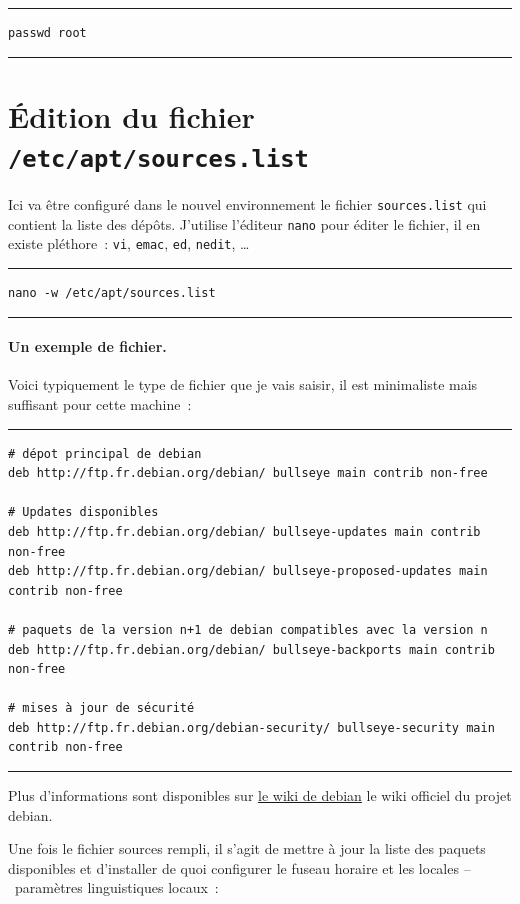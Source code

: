\documentclass[12pt, a4paper]{report}
\begin{document}
\noindent \rule{\linewidth}{0.5pt}
\begin{verbatim}
passwd root
\end{verbatim}
\rule{\linewidth}{0.5pt}

\section{Édition du fichier \texttt{/etc/apt/sources.list}}
Ici va être configuré dans le nouvel environnement le fichier \texttt{sources.list} qui contient la liste des dépôts. 
J'utilise l'éditeur \texttt{nano} pour éditer le fichier, il en existe pléthore~: \texttt{vi}, \texttt{emac}, \texttt{ed}, \texttt{nedit}, \ldots

\noindent \rule{\linewidth}{0.5pt}
\begin{verbatim}
nano -w /etc/apt/sources.list
\end{verbatim}
\rule{\linewidth}{0.5pt}

\paragraph{Un exemple de fichier.} 
Voici typiquement le type de fichier que je vais saisir, il est minimaliste mais suffisant pour cette machine~:

\noindent \rule{\linewidth}{0.5pt}
\begin{verbatim}
# dépot principal de debian
deb http://ftp.fr.debian.org/debian/ bullseye main contrib non-free

# Updates disponibles
deb http://ftp.fr.debian.org/debian/ bullseye-updates main contrib non-free
deb http://ftp.fr.debian.org/debian/ bullseye-proposed-updates main contrib non-free

# paquets de la version n+1 de debian compatibles avec la version n
deb http://ftp.fr.debian.org/debian/ bullseye-backports main contrib non-free

# mises à jour de sécurité
deb http://ftp.fr.debian.org/debian-security/ bullseye-security main contrib non-free
\end{verbatim}
\rule{\linewidth}{0.5pt}

Plus d'informations sont disponibles sur \href{https://wiki.debian.org/fr/SourcesList}{le wiki de debian} le wiki officiel du projet debian.

Une fois le fichier sources rempli, il s'agit de mettre à jour la liste des paquets disponibles et d'installer de quoi configurer le fuseau horaire et les locales --~paramètres linguistiques locaux~:
\end{document}
